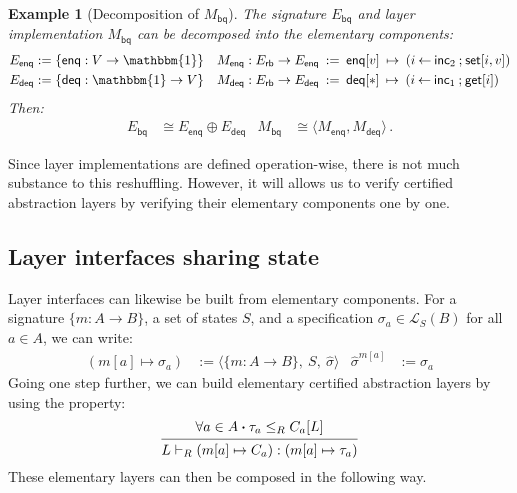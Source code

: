 \documentclass[11pt,oneside]{book}
\newtheorem{example}[theorem]{Example}
\theoremstyle{definition}
\newcommand{\kw}[1]{\ensuremath{ \mathsf{#1} }}
\newcommand{\bdot}{\boldsymbol{\cdot}}
\begin{document}

\begin{example}[Decomposition of $M_\kw{bq}$]
The signature $E_\kw{bq}$ and layer implementation $M_\kw{bq}$
can be decomposed into the elementary components:
\begin{align*}
  E_\kw{enq} &:= \{ \kw{enq} : V \rightarrow \mathbbm{1} \} &
  M_\kw{enq} : E_\kw{rb} \rightarrow E_\kw{enq} \: &:= \:
    \kw{enq}[v] \: \mapsto \:
     (i \mathbin{\leftarrow} \kw{inc}_2 \mathbin{;}
      \kw{set}[i, v]) \\
  E_\kw{deq} &:= \{ \kw{deq} : \mathbbm{1} \rightarrow V \} &
  M_\kw{deq} : E_\kw{rb} \rightarrow E_\kw{deq} \: &:= \:
    \kw{deq}[*] \:\mapsto\:
     (i \mathbin{\leftarrow} \kw{inc}_1 \mathbin{;}
      \kw{get}[i])
\end{align*}
Then:
\begin{align*}
  E_\kw{bq} &\cong E_\kw{enq} \oplus E_\kw{deq} &
  M_\kw{bq} &\cong \langle M_\kw{enq}, M_\kw{deq} \rangle \,.
\end{align*}
\end{example}

Since layer implementations are defined operation-wise,
there is not much substance to this reshuffling.
However,
it will allows us to verify certified abstraction layers
by verifying their elementary components one by one.


\subsection{Layer interfaces sharing state} \label{sec:layerprod} %

Layer interfaces can likewise be built from elementary components.
For a signature $\{ m : A \rightarrow B \}$,
a set of states $S$,
and a specification $\sigma_a \in \mathcal{L}_S(B)$ for all $a \in A$,
we can write:
\begin{align*}
  (m[a] \mapsto \sigma_a) &:=
  \langle
    \{ m : A \rightarrow B \}, \:
    S, \:
    \hat{\sigma}
  \rangle
  &
  \hat{\sigma}^{m[a]} &:= \sigma_a
\end{align*}
Going one step further,
we can build elementary certified abstraction layers
by using the property:
\[
  \begin{prooftree}
    \hypo{\forall a \in A \bdot \tau_a \le_R C_a[L]}
    \infer1{L \vdash_R (m[a] \mapsto C_a) : (m[a] \mapsto \tau_a)}
  \end{prooftree}
\]
These elementary layers
can then be composed in the following way.
\end{document}
